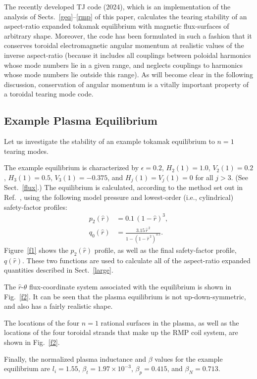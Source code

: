 \documentclass[12pt,prb,aps]{revtex4-1}
\begin{document}
  The recently developed TJ code (2024),
  which is an implementation of the analysis of Sects.~\ref{geq}--\ref{rmp} of this paper,  calculates the
  tearing stability of an aspect-ratio expanded tokamak equilibrium with magnetic flux-surfaces of arbitrary shape. Moreover, the code has been formulated in such a
  fashion that it conserves toroidal electromagnetic angular momentum at realistic values of the inverse aspect-ratio (because it
  includes all couplings between poloidal harmonics whose mode numbers lie in a given range, and neglects couplings to
  harmonics whose mode numbers lie outside this range). As will become clear in the following discussion, conservation of
  angular momentum is a vitally important property of a toroidal tearing mode code. 

\subsection{Example Plasma Equilibrium} 
Let us investigate the stability of an example tokamak equilibrium to $n=1$ tearing modes. 
 
 The example equilibrium is characterized by $\epsilon = 0.2$, $H_2(1) = 1.0$, $V_2(1)= 0.2$, $H_3(1)= 0.5$, $V_3(1)=-0.375$, and
$H_j(1)=V_j(1)=0$ for all $j>3$. (See Sect.~\ref{flux}.) The equilibrium is calculated, according to the method set out in Ref.~, using the following model pressure and lowest-order (i.e., cylindrical) safety-factor profiles:
\begin{align}
p_2(\hat{r})&= 0.1\,(1-\hat{r})^3,\\[0.5ex]
q_0(\hat{r}) &=\frac{3.15\,\hat{r}^{\,2}}{1-(1-\hat{r}^{\,2})^{3.5}}.
\end{align}
Figure~\ref{f1} shows the $p_2(\hat{r})$ profile, as well as the final safety-factor profile, $q(\hat{r})$. These two functions are used to 
calculate all of the aspect-ratio expanded quantities described in Sect.~\ref{large}. 

The $\hat{r}$-$\theta$ flux-coordinate system associated with the
equilibrium is shown in Fig.~\ref{f2}. It can be seen that the plasma equilibrium is not up-down-symmetric, and also has a fairly realistic shape. 

The
locations of  the four $n=1$
rational surfaces in the plasma, as well as the locations of the four toroidal strands that make up the RMP coil system, are  shown in Fig.~\ref{f2}. 

Finally, the normalized plasma inductance and $\beta$ values for the example equilibrium are $l_i=1.55$, $\beta_t =  1.97\times 10^{-3}$,
 $\beta_p =  0.415$, and $\beta_N =  0.713$. 
 
\end{document}
